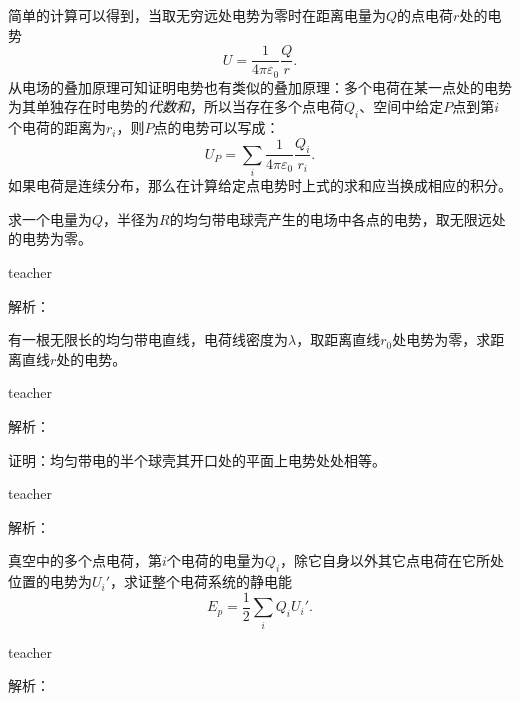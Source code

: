 简单的计算可以得到，当取无穷远处电势为零时在距离电量为$Q$的点电荷$r$处的电势
\[
U = \frac{1}{4\pi \varepsilon_0}\frac{Q}{r}.
\]
从电场的叠加原理可知证明电势也有类似的叠加原理：多个电荷在某一点处的电势为其单独存在时电势的\emph{代数和}，所以当存在多个点电荷$Q_i$、空间中给定$P$点到第$i$个电荷的距离为$r_i$，则$P$点的电势可以写成：
\begin{equation}
U_P = \sum_i \frac{1}{4\pi \varepsilon_0}\frac{Q_i}{r_i}.
\end{equation}
如果电荷是连续分布，那么在计算给定点电势时上式的求和应当换成相应的积分。



\begin{example}
求一个电量为$Q$，半径为$R$的均匀带电球壳产生的电场中各点的电势，取无限远处的电势为零。
\begin{taggedblock}{teacher}

解析：
\end{taggedblock}
\end{example}

\begin{example}
有一根无限长的均匀带电直线，电荷线密度为$\lambda$，取距离直线$r_0$处电势为零，求距离直线$r$处的电势。
\begin{taggedblock}{teacher}

解析：
\end{taggedblock}
\end{example}

\begin{example}
证明：均匀带电的半个球壳其开口处的平面上电势处处相等。
\begin{taggedblock}{teacher}

解析：
\end{taggedblock}
\end{example}

\begin{example}
真空中的多个点电荷，第$i$个电荷的电量为$Q_i$，除它自身以外其它点电荷在它所处位置的电势为$U_i'$，求证整个电荷系统的静电能
\[E_p = \frac{1}{2}\sum_i Q_iU_i'.\]

\begin{taggedblock}{teacher}

解析：
\end{taggedblock}
\end{example}

